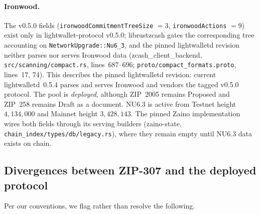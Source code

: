 \documentclass[11pt,a4paper]{article}
\theoremstyle{definition}
\begin{document}
\paragraph{Ironwood.} The v0.5.0 fields
(\texttt{ironwoodCommitmentTreeSize} $= 3$, \texttt{ironwoodActions} $= 9$)
exist only in \textsf{lightwallet-protocol} v0.5.0;
\textsf{librustzcash} gates the corresponding tree accounting on
\texttt{NetworkUpgrade::Nu6\_3}, and the pinned \textsf{lightwalletd}
revision neither parses nor serves Ironwood data
(\textsf{zcash\_client\_backend}, \texttt{src/scanning/compact.rs},
lines~687--696; \texttt{proto/compact\_formats.proto}, lines~17, 74). This
describes the pinned \textsf{lightwalletd} revision: current
\textsf{lightwalletd}~0.5.4 parses and serves Ironwood and vendors the tagged
v0.5.0 protocol. The pool is \emph{deployed}, although ZIP~2005 remains
Proposed and ZIP~258 remains Draft as a document. NU6.3 is active from
Testnet height $4{,}134{,}000$ and Mainnet height $3{,}428{,}143$.
The pinned \textsf{Zaino} implementation wires both
fields through its serving builders (\textsf{zaino-state},
\texttt{chain\_index/types/db/legacy.rs}), where they remain empty until
NU6.3 data exists on chain.

\subsection{Divergences between ZIP-307 and the deployed protocol}%
\label{sec:sync-compact-divergences}

Per our conventions, we flag rather than resolve the following.
\end{document}
